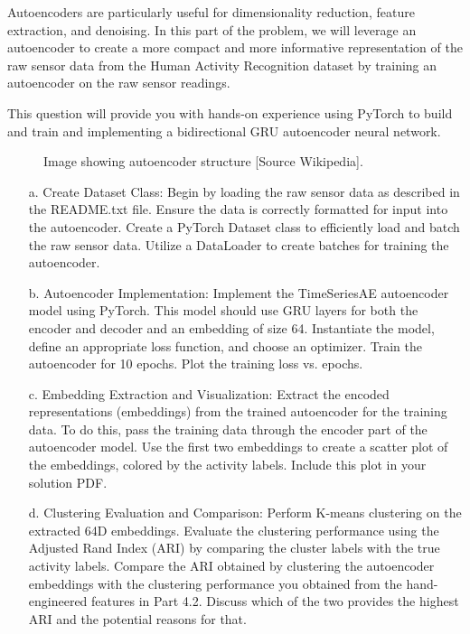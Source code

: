\documentclass[a3paper,12pt]{extarticle} %
\begin{document}
\begin{enumerate}
Autoencoders are particularly useful for dimensionality reduction, feature extraction, and denoising. In this part of the problem, we will leverage an autoencoder to create a more compact and more informative representation of the raw sensor data from the Human Activity Recognition dataset by training an autoencoder on the raw sensor readings.

This question will provide you with hands-on experience using PyTorch to build and train and implementing a bidirectional GRU autoencoder neural network.

\begin{figure}[h]
\centering
\caption{Image showing autoencoder structure [Source Wikipedia].}
\end{figure}

\begin{itemize}
\item[a.] Create Dataset Class: Begin by loading the raw sensor data as described in the README.txt file. Ensure the data is correctly formatted for input into the autoencoder. Create a PyTorch Dataset class to efficiently load and batch the raw sensor data. Utilize a DataLoader to create batches for training the autoencoder.

\item[b.] Autoencoder Implementation: Implement the TimeSeriesAE autoencoder model using PyTorch. This model should use GRU layers for both the encoder and decoder and an embedding of size 64. Instantiate the model, define an appropriate loss function, and choose an optimizer. Train the autoencoder for 10 epochs. Plot the training loss vs. epochs.

\item[c.] Embedding Extraction and Visualization: Extract the encoded representations (embeddings) from the trained autoencoder for the training data. To do this, pass the training data through the encoder part of the autoencoder model. Use the first two embeddings to create a scatter plot of the embeddings, colored by the activity labels. Include this plot in your solution PDF.

\item[d.] Clustering Evaluation and Comparison: Perform K-means clustering on the extracted 64D embeddings. Evaluate the clustering performance using the Adjusted Rand Index (ARI) by comparing the cluster labels with the true activity labels. Compare the ARI obtained by clustering the autoencoder embeddings with the clustering performance you obtained from the hand-engineered features in Part 4.2. Discuss which of the two provides the highest ARI and the potential reasons for that.
\end{itemize}

\end{enumerate}
\end{document}
